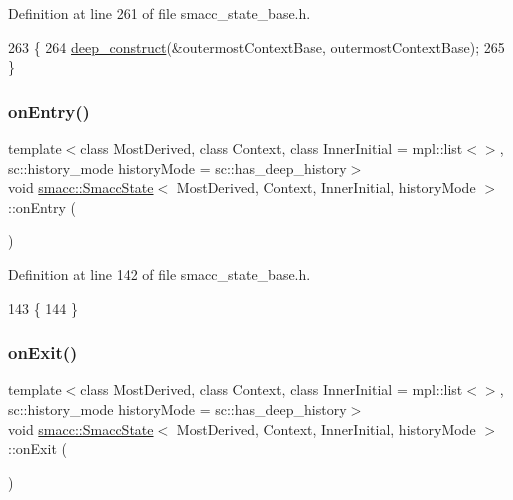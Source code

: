 Definition at line 261 of file smacc\+\_\+state\+\_\+base.\+h.


\begin{DoxyCode}
263   \{
264     \hyperlink{classsmacc_1_1SmaccState_aac23d8a6909f75c5e5fca2a7c09b5368}{deep\_construct}(&outermostContextBase, outermostContextBase);
265   \}
\end{DoxyCode}
\mbox{\label{classsmacc_1_1SmaccState_a4a10a74fdbe51a798b8d651668b8ed9a}} 
\subsubsection{\texorpdfstring{on\+Entry()}{onEntry()}}
{\footnotesize\ttfamily template$<$class Most\+Derived, class Context, class Inner\+Initial = mpl\+::list$<$$>$, sc\+::history\+\_\+mode history\+Mode = sc\+::has\+\_\+deep\+\_\+history$>$ \\
void \hyperlink{classsmacc_1_1SmaccState}{smacc\+::\+Smacc\+State}$<$ Most\+Derived, Context, Inner\+Initial, history\+Mode $>$\+::on\+Entry (\begin{DoxyParamCaption}{ }\end{DoxyParamCaption})\hspace{0.3cm}{\ttfamily [inline]}}



Definition at line 142 of file smacc\+\_\+state\+\_\+base.\+h.


\begin{DoxyCode}
143   \{
144   \}
\end{DoxyCode}
\mbox{\label{classsmacc_1_1SmaccState_a82ca7c69153e86dc5eedf3f909560f3a}} 
\subsubsection{\texorpdfstring{on\+Exit()}{onExit()}}
{\footnotesize\ttfamily template$<$class Most\+Derived, class Context, class Inner\+Initial = mpl\+::list$<$$>$, sc\+::history\+\_\+mode history\+Mode = sc\+::has\+\_\+deep\+\_\+history$>$ \\
void \hyperlink{classsmacc_1_1SmaccState}{smacc\+::\+Smacc\+State}$<$ Most\+Derived, Context, Inner\+Initial, history\+Mode $>$\+::on\+Exit (\begin{DoxyParamCaption}{ }\end{DoxyParamCaption})\hspace{0.3cm}{\ttfamily [inline]}}




